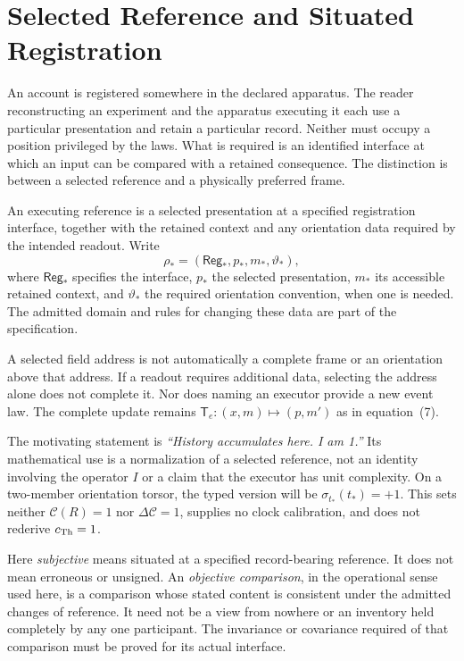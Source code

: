 \begingroup
\renewcommand{\thesection}{4B}
\section{Selected Reference and Situated Registration}\label{sec:executingreference}
An account is registered somewhere in the declared apparatus. The reader reconstructing an experiment and the apparatus executing it each use a particular presentation and retain a particular record. Neither must occupy a position privileged by the laws. What is required is an identified interface at which an input can be compared with a retained consequence. The distinction is between a selected reference and a physically preferred frame.

\begin{definition}\label{def:executingreference}
An executing reference is a selected presentation at a specified registration interface, together with the retained context and any orientation data required by the intended readout. Write
\begin{equation}
\rho_*=(\mathsf{Reg}_*,p_*,m_*,\vartheta_*),
\tag{RF1}\label{eq:executingreference}
\end{equation}
where $\mathsf{Reg}_*$ specifies the interface, $p_*$ the selected presentation, $m_*$ its accessible retained context, and $\vartheta_*$ the required orientation convention, when one is needed. The admitted domain and rules for changing these data are part of the specification.
\end{definition}
A selected field address is not automatically a complete frame or an orientation above that address. If a readout requires additional data, selecting the address alone does not complete it. Nor does naming an executor provide a new event law. The complete update remains $\mathsf T_e:(x,m)\mapsto(p,m')$ as in equation~(7).

The motivating statement is \emph{``History accumulates here. I am 1.''} Its mathematical use is a normalization of a selected reference, not an identity involving the operator $I$ or a claim that the executor has unit complexity. On a two-member orientation torsor, the typed version will be $\sigma_{t_*}(t_*)=+1$. This sets neither $\mathcal C(R)=1$ nor $\Delta\mathcal C=1$, supplies no clock calibration, and does not rederive $c_{\mathrm{Th}}=1$.

Here \emph{subjective} means situated at a specified record-bearing reference. It does not mean erroneous or unsigned. An \emph{objective comparison}, in the operational sense used here, is a comparison whose stated content is consistent under the admitted changes of reference. It need not be a view from nowhere or an inventory held completely by any one participant. The invariance or covariance required of that comparison must be proved for its actual interface.

